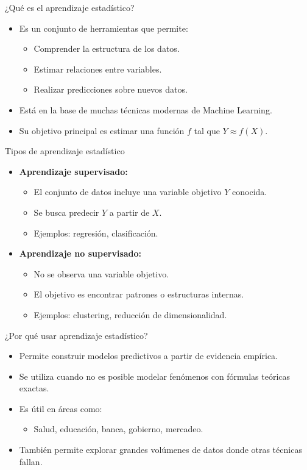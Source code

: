 \documentclass{beamer}
\begin{document}
\begin{frame}{¿Qué es el aprendizaje estadístico?}
	\begin{itemize}
		\item Es un conjunto de herramientas que permite:
		\begin{itemize}
			\item Comprender la estructura de los datos.
			\item Estimar relaciones entre variables.
			\item Realizar predicciones sobre nuevos datos.
		\end{itemize}
		\item Está en la base de muchas técnicas modernas de Machine Learning.
		\item Su objetivo principal es estimar una función $f$ tal que $Y \approx f(X)$.
	\end{itemize}
\end{frame}

\begin{frame}{Tipos de aprendizaje estadístico}
	\begin{itemize}
		\item \textbf{Aprendizaje supervisado:}
		\begin{itemize}
			\item El conjunto de datos incluye una variable objetivo $Y$ conocida.
			\item Se busca predecir $Y$ a partir de $X$.
			\item Ejemplos: regresión, clasificación.
		\end{itemize}
		
		\item \textbf{Aprendizaje no supervisado:}
		\begin{itemize}
			\item No se observa una variable objetivo.
			\item El objetivo es encontrar patrones o estructuras internas.
			\item Ejemplos: clustering, reducción de dimensionalidad.
		\end{itemize}
	\end{itemize}
\end{frame}


\begin{frame}{¿Por qué usar aprendizaje estadístico?}
	\begin{itemize}
		\item Permite construir modelos predictivos a partir de evidencia empírica.
		\item Se utiliza cuando no es posible modelar fenómenos con fórmulas teóricas exactas.
		\item Es útil en áreas como:
		\begin{itemize}
			\item Salud, educación, banca, gobierno, mercadeo.
		\end{itemize}
		\item También permite explorar grandes volúmenes de datos donde otras técnicas fallan.
	\end{itemize}
\end{frame}
\end{document}
